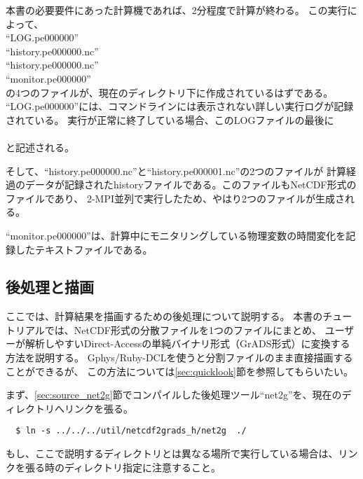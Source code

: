 本書の必要要件にあった計算機であれば、2分程度で計算が終わる。
\noindent この実行によって、\\
``LOG.pe000000''\\
``history.pe000000.nc''\\
``history.pe000000.nc''\\
``monitor.pe000000''\\
の4つのファイルが、現在のディレクトリ下に作成されているはずである。
``LOG.pe000000''には、コマンドラインには表示されない詳しい実行ログが記録されている。
実行が正常に終了している場合、このLOGファイルの最後に\\

{\small {\gt
{}}}\\
\noindent と記述される。

そして、``history.pe000000.nc''と``history.pe000001.nc''の2つのファイルが
計算経過のデータが記録されたhistoryファイルである。このファイルもNetCDF形式のファイルであり、
2-MPI並列で実行したため、やはり2つのファイルが生成される。

``monitor.pe000000''は、計算中にモニタリングしている物理変数の時間変化を記録したテキストファイルである。



\subsection{後処理と描画}
ここでは、計算結果を描画するための後処理について説明する。
本書のチュートリアルでは、NetCDF形式の分散ファイルを1つのファイルにまとめ、
ユーザーが解析しやすいDirect-Accessの単純バイナリ形式（GrADS形式）に変換する方法を説明する。
Gphys/Ruby-DCLを使うと分割ファイルのまま直接描画することができるが、
この方法については\ref{sec:quicklook}節を参照してもらいたい。

まず、\ref{sec:source_net2g}節でコンパイルした後処理ツール``net2g''を、現在のディレクトリへリンクを張る。
\begin{verbatim}
  $ ln -s ../../../util/netcdf2grads_h/net2g  ./
\end{verbatim}
もし、ここで説明するディレクトリとは異なる場所で実行している場合は、リンクを張る時のディレクトリ指定に注意すること。

